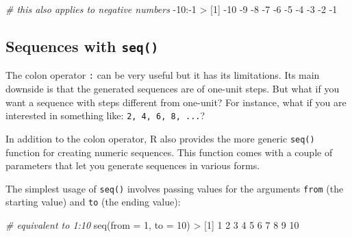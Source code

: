 \documentclass[
]{book}
\newenvironment{Shaded}{\begin{snugshade}}{\end{snugshade}}
\newcommand{\AttributeTok}[1]{\textcolor[rgb]{0.77,0.63,0.00}{#1}}
\newcommand{\CommentTok}[1]{\textcolor[rgb]{0.56,0.35,0.01}{\textit{#1}}}
\newcommand{\DecValTok}[1]{\textcolor[rgb]{0.00,0.00,0.81}{#1}}
\newcommand{\FunctionTok}[1]{\textcolor[rgb]{0.00,0.00,0.00}{#1}}
\newcommand{\NormalTok}[1]{#1}
\newcommand{\SpecialCharTok}[1]{\textcolor[rgb]{0.00,0.00,0.00}{#1}}
\begin{document}
\begin{Shaded}
\begin{Highlighting}[]
\CommentTok{\# this also applies to negative numbers}
\SpecialCharTok{{-}}\DecValTok{10}\SpecialCharTok{:{-}}\DecValTok{1}
\SpecialCharTok{\textgreater{}}\NormalTok{  [}\DecValTok{1}\NormalTok{] }\SpecialCharTok{{-}}\DecValTok{10}  \SpecialCharTok{{-}}\DecValTok{9}  \SpecialCharTok{{-}}\DecValTok{8}  \SpecialCharTok{{-}}\DecValTok{7}  \SpecialCharTok{{-}}\DecValTok{6}  \SpecialCharTok{{-}}\DecValTok{5}  \SpecialCharTok{{-}}\DecValTok{4}  \SpecialCharTok{{-}}\DecValTok{3}  \SpecialCharTok{{-}}\DecValTok{2}  \SpecialCharTok{{-}}\DecValTok{1}
\end{Highlighting}
\end{Shaded}

\hypertarget{sequences-with-seq}{%
\subsection{\texorpdfstring{Sequences with \texttt{seq()}}{Sequences with seq()}}\label{sequences-with-seq}}

The colon operator \texttt{:} can be very useful but it has its limitations. Its main
downside is that the generated sequences are of one-unit steps. But what if
you want a sequence with steps different from one-unit? For instance, what if
you are interested in something like: \texttt{2,\ 4,\ 6,\ 8,\ ...}?

In addition to the colon operator, R also provides the more generic \texttt{seq()}
function for creating numeric sequences. This function comes with a couple of
parameters that let you generate sequences in various forms.

The simplest usage of \texttt{seq()} involves passing values for the arguments \texttt{from}
(the starting value) and \texttt{to} (the ending value):

\begin{Shaded}
\begin{Highlighting}[]
\CommentTok{\# equivalent to 1:10}
\FunctionTok{seq}\NormalTok{(}\AttributeTok{from =} \DecValTok{1}\NormalTok{, }\AttributeTok{to =} \DecValTok{10}\NormalTok{)}
\SpecialCharTok{\textgreater{}}\NormalTok{  [}\DecValTok{1}\NormalTok{]  }\DecValTok{1}  \DecValTok{2}  \DecValTok{3}  \DecValTok{4}  \DecValTok{5}  \DecValTok{6}  \DecValTok{7}  \DecValTok{8}  \DecValTok{9} \DecValTok{10}
\end{Highlighting}
\end{Shaded}
\end{document}
